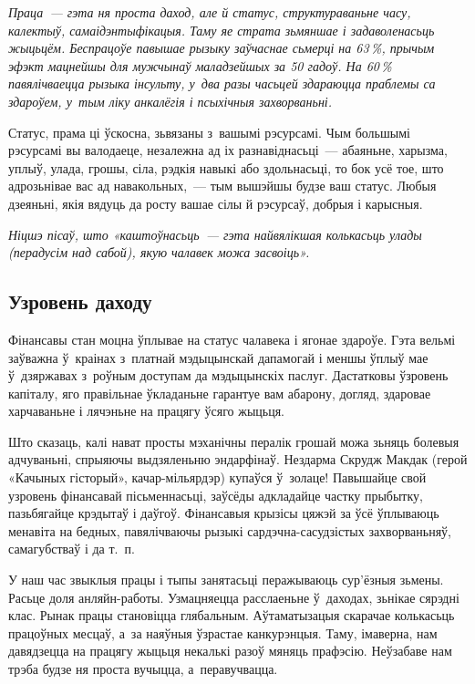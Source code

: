 \emph{Праца~--- гэта ня проста даход, але й статус, структураваньне часу, калектыў, самаідэнтыфікацыя. Таму яе страта зьмяншае і задаволенасьць жыцьцём. Беспрацоўе павышае рызыку заўчаснае сьмерці на 63\,\%, прычым эфэкт мацнейшы для мужчынаў маладзейшых за 50 гадоў. На 60\,\% павялічваецца рызыка інсульту, у~два разы часьцей здараюцца праблемы са здароўем, у~тым ліку анкалёгія і псыхічныя захворваньні.}

Статус, прама ці ўскосна, зьвязаны з~вашымі рэсурсамі. Чым большымі рэсурсамі вы валодаеце, незалежна ад іх разнавіднасьці~--- абаяньне, харызма, уплыў, улада, грошы, сіла, рэдкія навыкі або здольнасьці, то бок усё тое, што адрозьнівае вас ад навакольных,~--- тым вышэйшы будзе ваш статус. Любыя дзеяньні, якія вядуць да росту вашае сілы й рэсурсаў, добрыя і карысныя.

\emph{Ніцшэ пісаў, што «каштоўнасьць~--- гэта найвялікшая колькасьць улады (перадусім над сабой), якую чалавек можа засвоіць».}

\subsection*{Узровень даходу}

Фінансавы стан моцна ўплывае на статус чалавека і ягонае здароўе. Гэта вельмі заўважна ў~краінах з~платнай мэдыцынскай дапамогай і меншы ўплыў мае ў~дзяржавах з~роўным доступам да мэдыцынскіх паслуг. Дастатковы ўзровень капіталу, яго правільнае ўкладаньне гарантуе вам абарону, догляд, здаровае харчаваньне і лячэньне на працягу ўсяго жыцьця.


Што сказаць, калі нават просты мэханічны пералік грошай можа зьняць болевыя адчуваньні, спрыяючы выдзяленьню эндарфінаў. Нездарма Скрудж Макдак (герой «Качыных гісторый», качар-мільярдэр) купаўся ў~золаце! Павышайце свой узровень фінансавай пісьменнасьці, заўсёды адкладайце частку прыбытку, пазьбягайце крэдытаў і даўгоў. Фінансавыя крызісы цяжэй за ўсё ўплываюць менавіта на бедных, павялічваючы рызыкі сардэчна-сасудзістых захворваньняў, самагубстваў і да т.~п.

У наш час звыклыя працы і тыпы занятасьці перажываюць сур'ёзныя зьмены. Расьце доля анляйн-работы. Узмацняецца расслаеньне ў~даходах, зьнікае сярэдні клас. Рынак працы становіцца глябальным. Аўтаматызацыя скарачае колькасьць працоўных месцаў, а~за наяўныя ўзрастае канкурэнцыя. Таму, імаверна, нам давядзецца на працягу жыцьця некалькі разоў мяняць прафэсію. Неўзабаве нам трэба будзе ня проста вучыцца, а~перавучвацца.

